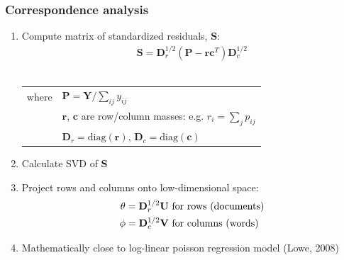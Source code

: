 \documentclass{beamer}
\begin{document}
\begin{frame}
	\frametitle{Correspondence analysis}
	
	\begin{enumerate}[<+->]
		\item Compute matrix of standardized residuals, $\mathbf{S}$:\\
		\vspace{-.8cm}
		\begin{align*}\mathbf{S} = \mathbf{D}_r^{1/2} (\mathbf{P}-\mathbf{rc}^{T})\mathbf{D}_c^{1/2} \end{align*}\\
		\vspace{-.3cm}
		\begin{tabular}{ll}
			where & $\mathbf{P}=\mathbf{Y}/\sum_{ij}y_{ij}$\\
			&$\mathbf{r}$, $\mathbf{c}$ are row/column masses: e.g. $r_i=\sum_j p_{ij}$\\
			&$\mathbf{D}_r=\textrm{diag}(\mathbf{r})$, $\mathbf{D}_c=\textrm{diag}(\mathbf{c})$
		\end{tabular}
		\vspace{.25cm}
		\item Calculate SVD of $\mathbf{S}$
		\vspace{.25cm}
		\item Project rows and columns onto low-dimensional space:\\
		\vspace{-.8cm}
		\begin{align*}
		\mathbf{\theta}=\mathbf{D}_r^{1/2} \mathbf{U} & \textrm{ for rows (documents)}\\
		\vspace{-.2cm}
		\mathbf{\phi}=\mathbf{D}_c^{1/2} \mathbf{V} &  \textrm{ for columns (words)}
		\end{align*}
		\item[] Mathematically close to \alert{log-linear poisson regression model} {\color{gray}\footnotesize{(Lowe, 2008)}}
	\end{enumerate}
\end{frame}
\end{document}
